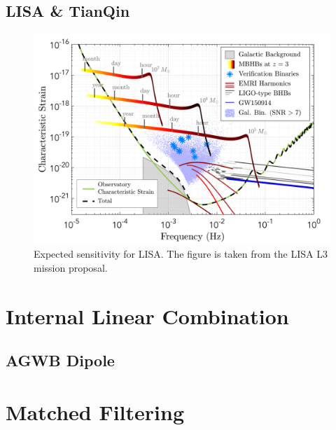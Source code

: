 \subsection{LISA \& TianQin}

\begin{figure}[h]
    \centering
    \includegraphics[width=0.7\linewidth]{Images/lisa_frequency_sensitivity.png}
    \caption{Expected sensitivity for LISA. The figure is taken from the LISA L3 mission proposal.}
    \label{LISA_F_sensitivity}
\end{figure} 

\section{Internal Linear Combination}

\subsection{AGWB Dipole}
\section{Matched Filtering}